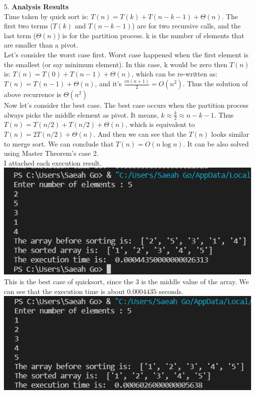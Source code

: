 \documentclass{article}
\begin{document}
5. \textbf{Analysis Results} \\
\indent Time taken by quick sort is: $T(n) = T(k) + T(n-k-1) + \Theta(n)$. The first two terms ($T(k)$ and $T(n-k-1)$) are for two recursive calls, and the last term ($\Theta(n)$) is for the partition process. k is the number of elements that are smaller than a pivot. \\
\indent Let's consider the worst case first. Worst case happened when the first element is the smallest (or say minimum element). In this case, k would be zero then $T(n)$ is: $T(n) = T(0) + T(n-1) + \Theta(n)$, which can be re-written as: $T(n) = T(n-1) + \Theta(n)$, and it's $\frac{cn(n+1)}{2} = O(n^2)$. Thus the solution of above recurrence is $\Theta(n^2)$ \\
\indent Now let's consider the best case. The best case occurs when the partition process always picks the middle element as pivot. It means, $k \approx \frac{k}{2} \approx n-k-1$. Thus $T(n) = T(n/2) + T(n/2) + \Theta(n)$, which is equivalent to $T(n) = 2T(n/2) + \Theta(n)$. And then we can see that the $T(n)$ looks similar to merge sort. We can conclude that $T(n) = O(n\log n)$. It can be also solved using Master Theorem's case 2. \\
I attached each execution result. \\
\includegraphics[scale = 0.7]{25314} \\
This is the best case of quicksort, since the 3 is the middle value of the array. We can see that the execution time is about $0.0004435$ seconds.\\
\includegraphics[scale = 0.7]{Ordered 25314} \\
\end{document}

